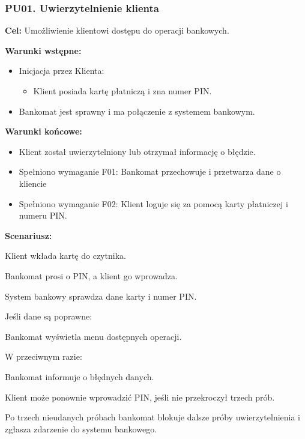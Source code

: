 \documentclass[10pt,a4paper]{article}
\begin{document}
\subsubsection*{PU01. Uwierzytelnienie klienta}

\noindent\textbf{Cel:} Umożliwienie klientowi dostępu do operacji bankowych.

\noindent\textbf{Warunki wstępne:}
\begin{itemize}
    \item Inicjacja przez Klienta:
    \begin{itemize}
        \item Klient posiada kartę płatniczą i zna numer PIN.
    \end{itemize}
    \item Bankomat jest sprawny i ma połączenie z systemem bankowym.
\end{itemize}

\noindent\textbf{Warunki końcowe:}
\begin{itemize}
    \item Klient został uwierzytelniony lub otrzymał informację o błędzie.
    \item Spełniono wymaganie F01: Bankomat przechowuje i przetwarza dane o kliencie
    \item Spełniono wymaganie F02: Klient loguje się za pomocą karty płatniczej i numeru PIN.
\end{itemize}

\noindent\textbf{Scenariusz:}
\begin{scenariusz}
    \item Klient wkłada kartę do czytnika.
    \item Bankomat prosi o PIN, a klient go wprowadza.
    \item System bankowy sprawdza dane karty i numer PIN.
    \item Jeśli dane są poprawne:
    \begin{scenariusz}
        \item Bankomat wyświetla menu dostępnych operacji.
    \end{scenariusz}
    \item W przeciwnym razie:
    \begin{scenariusz}
        \item Bankomat informuje o błędnych danych.
        \item Klient może ponownie wprowadzić PIN, jeśli nie przekroczył trzech prób.
        \item Po trzech nieudanych próbach bankomat blokuje dalsze próby uwierzytelnienia i zgłasza zdarzenie do systemu bankowego.
    \end{scenariusz}
\end{scenariusz}
\end{document}
